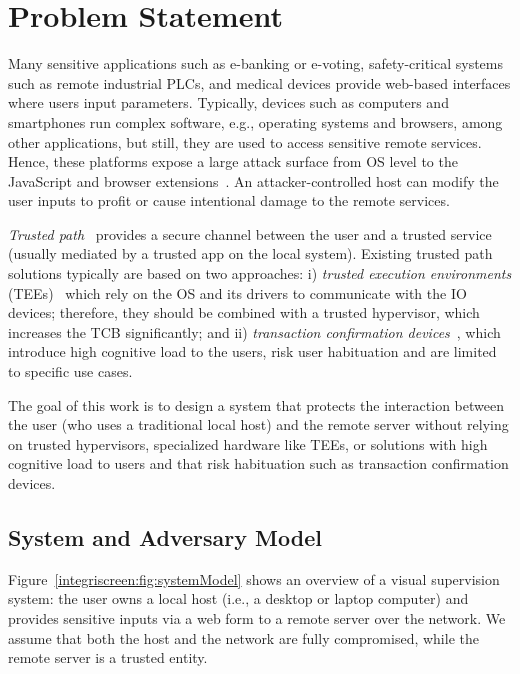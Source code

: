 \section{Problem Statement}
\label{sec:problemStatement_IS}

Many sensitive applications such as e-banking or e-voting, safety-critical systems such as remote industrial PLCs, and medical devices provide web-based interfaces where users input parameters. Typically, devices such as computers and smartphones run complex software, e.g., operating systems and browsers, among other applications, but still, they are used to access sensitive remote services. Hence, these platforms expose a large attack surface from OS level to the JavaScript and browser extensions~\cite{driveByDownload, extensionSecurity, extensionSecurity1, extensionHack1, microsoftPatches, kernelSecurity, linuxMalware, zeusMalware, wannacry}. An attacker-controlled host can modify the user inputs to profit or cause intentional damage to the remote services.

\emph{Trusted path}~\cite{x86} provides a secure channel between the user and a trusted service (usually mediated by a trusted app on the local system). Existing trusted path solutions typically are based on two approaches: i) \textit{trusted execution environments} (TEEs)~\cite{sgxio} which rely on the OS and its drivers to communicate with the IO devices; therefore, they should be combined with a trusted hypervisor, which increases the TCB significantly; and ii) \textit{transaction confirmation devices}~\cite{filyanov2011uni}, which introduce high cognitive load to the users, risk user habituation and are limited to specific use cases.

The goal of this work is to design a system that protects the interaction between the user (who uses a traditional local host) and the remote server without relying on trusted hypervisors, specialized hardware like TEEs, or solutions with high cognitive load to users and that risk habituation such as transaction confirmation devices.

\subsection{System and Adversary Model}
\label{sec:problemStatement:systemMode}

Figure~\ref{integriscreen:fig:systemModel} shows an overview of a visual supervision system: the user owns a local host (i.e., a desktop or laptop computer) and provides sensitive inputs via a web form to a remote server over the network. We assume that both the host and the network are fully compromised, while the remote server is a trusted entity. 

